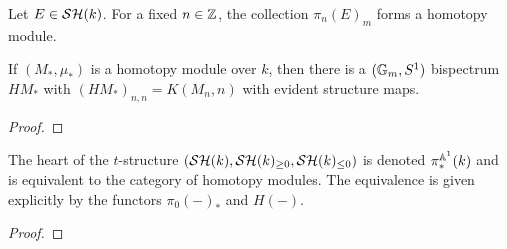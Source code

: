 \documentclass{amsart}%
\begin{document}
\begin{lemma}
  Let $E \in \mathcal{SH}(k)$. For a fixed $n\in\mathbb{Z}$, the collection
  $\pi_{n}(E)_{m}$ forms a homotopy module.
\end{lemma}

\begin{lemma}
  If $(M_*, \mu_*)$ is a homotopy module over $k$, then there is a
  $(\mathbb{G}_m, S^1)$ bispectrum $HM_*$ with $(HM_*)_{n,n} = K(M_n,n)$
  with evident structure maps. 
\end{lemma}

\begin{proof}
  
\end{proof}

\begin{theorem}
  The heart of the $t$-structure
  $(\mathcal{SH}(k), \mathcal{SH}(k)_{\geq 0}, \mathcal{SH}(k)_{\leq 0})$ is denoted
  $\pi^{\mathbb{A}^1}_*(k)$ and is equivalent to the category of homotopy
  modules. The equivalence is given explicitly by the functors
  $\pi_0(-)_*$ and $H(-)$. 
\end{theorem}

\begin{proof}
  
\end{proof}
\end{document}
